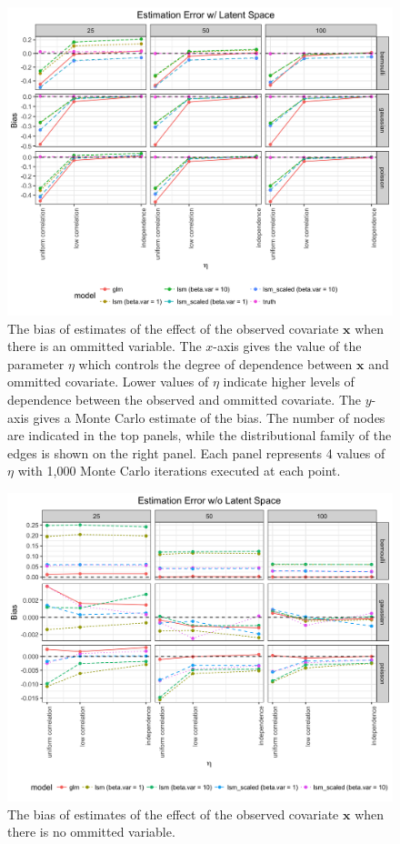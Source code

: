 \documentclass[11pt]{article}
\begin{document}
\begin{figure}
\includegraphics[width=\textwidth]{figures/estimation_ls.png}
\caption{The bias of estimates of the effect of the observed covariate $\mathbf{x}$ when there is an ommitted variable. The $x$-axis gives the value of the parameter $\eta$ which controls the degree of dependence between $\mathbf{x}$ and ommitted covariate. Lower values of $\eta$ indicate higher levels of dependence between the observed and ommitted covariate. The $y$-axis gives a Monte Carlo estimate of the bias. The number of nodes are indicated in the top panels, while the distributional family of the edges is shown on the right panel. Each panel represents 4 values of $\eta$ with 1,000 Monte Carlo iterations executed at each point.
\label{fig:estimation_ls}}
\end{figure}

\begin{figure}
\includegraphics[width=\textwidth]{figures/estimation_nls.png}
\caption{The bias of estimates of the effect of the observed covariate $\mathbf{x}$ when there is no ommitted variable.
\label{fig:estimation_nls}}
\end{figure}
\end{document}
